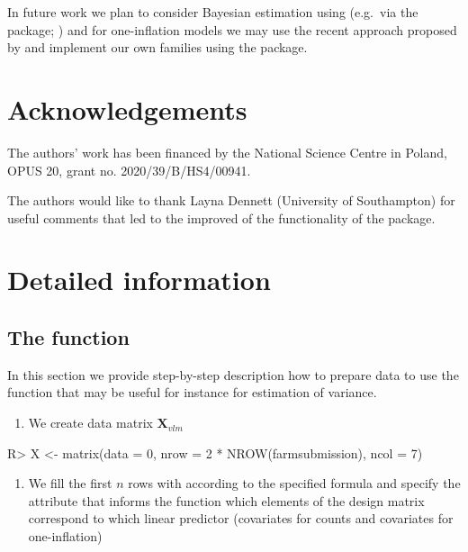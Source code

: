 \documentclass[
]{jss}
\providecommand{\tightlist}{%
  \setlength{\itemsep}{0pt}\setlength{\parskip}{0pt}}
\newcommand{\1}{\mathcal{I}} \newcommand{\bZero}{\boldsymbol{0}}
\begin{document}
In future work we plan to consider Bayesian estimation using
 (e.g.~via the  package;
\cite{carpenter2017stan, brms}) and for one-inflation models we may use
the recent approach proposed by \cite{tuoto2022bayesian} and implement
our own families using the  package.

\section{Acknowledgements}\label{Acknowledgements}

The authors' work has been financed by the National Science Centre in
Poland, OPUS 20, grant no. 2020/39/B/HS4/00941.

The authors would like to thank Layna Dennett (University of
Southampton) for useful comments that led to the improved of the
functionality of the package.

\appendix

\section{Detailed information}\label{sec-details}

\subsection[The estimatePopsizeFit function]{The
 function}\label{sec-estimatePopsizeFit}

In this section we provide step-by-step description how to prepare data
to use the  function that may be useful for
instance for estimation of variance.

\begin{enumerate}
\def\labelenumi{\arabic{enumi}.}
\tightlist
\item
  We create data matrix \(\boldsymbol{X}_{vlm}\)
\end{enumerate}

\begin{CodeChunk}
\begin{CodeInput}
R> X <- matrix(data = 0, nrow = 2 * NROW(farmsubmission), ncol = 7)
\end{CodeInput}
\end{CodeChunk}

\begin{enumerate}
\def\labelenumi{\arabic{enumi}.}
\setcounter{enumi}{1}
\tightlist
\item
  We fill the first \(n\) rows with  according to the
  specified formula and specify the attribute  that
  informs the function which elements of the design matrix correspond to
  which linear predictor (covariates for counts and covariates for
  one-inflation)
\end{enumerate}
\end{document}
